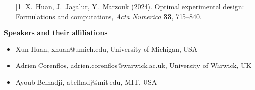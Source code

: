 \begin{session}
 \medskip
 \begin{enumerate}
 \item[{[1]}] X.\ Huan, J.\ Jagalur, Y.\ Marzouk (2024). Optimal experimental design: Formulations and computations, \textit{Acta Numerica} \textbf{33}, 715--840.
 \end{enumerate}
 \textbf{Speakers and their affiliations}
 \begin{itemize}
 \item Xun Huan, xhuan@umich.edu, University of Michigan, USA
 \item Adrien Corenflos, adrien.corenflos@warwick.ac.uk, University of Warwick, UK
 \item Ayoub Belhadji, abelhadj@mit.edu, MIT, USA
 \end{itemize}
\end{session}



\clearpage


